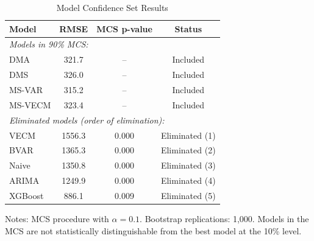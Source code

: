 \begin{table}[htbp]
\centering
\small
\caption{Model Confidence Set Results}
\label{tab:mcs}
\begin{tabular}{lccc}
\toprule
Model & RMSE & MCS p-value & Status \\
\midrule
\multicolumn{4}{l}{\textit{Models in 90\% MCS:}} \\
DMA & 321.7 & -- & Included \\
DMS & 326.0 & -- & Included \\
MS-VAR & 315.2 & -- & Included \\
MS-VECM & 323.4 & -- & Included \\
\midrule
\multicolumn{4}{l}{\textit{Eliminated models (order of elimination):}} \\
VECM & 1556.3 & 0.000 & Eliminated (1) \\
BVAR & 1365.3 & 0.000 & Eliminated (2) \\
Naive & 1350.8 & 0.000 & Eliminated (3) \\
ARIMA & 1249.9 & 0.000 & Eliminated (4) \\
XGBoost & 886.1 & 0.009 & Eliminated (5) \\
\bottomrule
\end{tabular}
\begin{tablenotes}
\small
\item Notes: MCS procedure with $\alpha = 0.1$. 
Bootstrap replications: 1,000. Models in the MCS are not statistically 
distinguishable from the best model at the 10\% level.
\end{tablenotes}
\end{table}